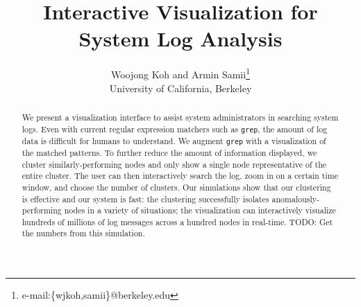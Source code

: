 \documentclass[conference]{style/acmsiggraph}
\title{Interactive Visualization for System Log Analysis}
\author{Woojong Koh and Armin Samii\thanks{e-mail:\{wjkoh,samii\}@berkeley.edu}\\University of California, Berkeley}
\begin{document}

\maketitle

\begin{abstract}

We present a visualization interface to assist system administrators in searching system logs.
Even with current regular expression matchers such as \texttt{grep}, the amount of log data is difficult for humans to understand.
We augment \texttt{grep} with a visualization of the matched patterns.
To further reduce the amount of information displayed, we cluster similarly-performing nodes and only show a single node representative of the entire cluster.
The user can then interactively search the log, zoom in on a certain time window, and choose the number of clusters.
Our simulations show that our clustering is effective and our system is fast:
the clustering successfully isolates anomalously-performing nodes in a variety of situations;
the visualization can interactively visualize hundreds of millions of log messages across a hundred nodes in real-time.
TODO: Get the numbers from this simulation.

\end{abstract}
\end{document}
